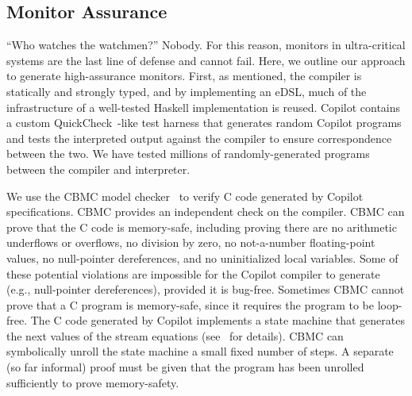 \subsection{Monitor Assurance}\label{sec:assurance}
``Who watches the watchmen?''  Nobody.  For this reason, monitors in
ultra-critical systems are the last line of defense and cannot fail.  Here, we
outline our approach to generate high-assurance monitors.  First, as mentioned,
the compiler is statically and strongly typed, and by implementing an eDSL, much
of the infrastructure of a well-tested Haskell implementation is reused.
Copilot contains a custom QuickCheck~\cite{qc}-like test harness that generates
random Copilot programs and tests the interpreted output against the compiler to
ensure correspondence between the two.  We have tested millions of randomly-generated programs
between the compiler and interpreter.

We use the CBMC model checker~\cite{cbmc} to verify C code generated by Copilot
specifications.  CBMC provides an independent check on the compiler.  CBMC can
prove that the C code is memory-safe, including proving there are no arithmetic
underflows or overflows, no division by zero, no not-a-number floating-point
values, no null-pointer dereferences, and no uninitialized local variables.
Some of these potential violations are impossible for the Copilot compiler to
generate (e.g., null-pointer dereferences), provided it is bug-free.  Sometimes
CBMC cannot prove that a C program is memory-safe, since it requires the program
to be loop-free.  The C code generated by Copilot implements a state machine
that generates the next values of the stream equations (see~\cite{copilot} for
details).  CBMC can symbolically unroll the state machine a small fixed number
of steps.  A separate (so far informal) proof must be given that the program has
been unrolled sufficiently to prove memory-safety.  %
